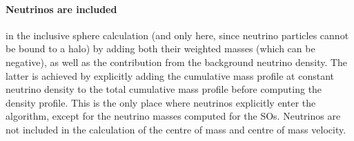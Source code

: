 \documentclass{article}
\begin{document}
\paragraph{Neutrinos are included} in the inclusive sphere calculation (and only here, since neutrino 
particles cannot be bound to a halo) by adding both their weighted masses (which can be negative), as well as 
the contribution from the background neutrino density. The latter is achieved by explicitly adding the 
cumulative mass profile at constant neutrino density to the total cumulative mass profile before computing the 
density profile. This is the only place where neutrinos explicitly enter the algorithm, except for the 
neutrino masses computed for the SOs. Neutrinos are not included in the calculation of the centre of mass and 
centre of mass velocity.
\end{document}

